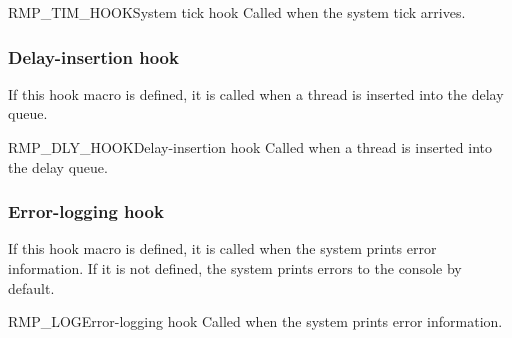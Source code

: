 \begin{apidesc}{RMP\_TIM\_HOOK}{System tick hook}\label{api:RMP_TIM_HOOK}
    Called when the system tick arrives.
    \begin{apiparams}
    \end{apiparams}
    \begin{apiret}
    \end{apiret}
\end{apidesc}

\subsubsection{Delay-insertion hook}

If this hook macro is defined, it is called when a thread is inserted into the delay queue.

\begin{apidesc}{RMP\_DLY\_HOOK}{Delay-insertion hook}\label{api:RMP_DLY_HOOK}
    Called when a thread is inserted into the delay queue.
    \begin{apiparams}
    \end{apiparams}
    \begin{apiret}
    \end{apiret}
\end{apidesc}

\subsubsection{Error-logging hook}

If this hook macro is defined, it is called when the system prints error information.
If it is not defined, the system prints errors to the console by default.

\begin{apidesc}{RMP\_LOG}{Error-logging hook}\label{api:RMP_Log}
    Called when the system prints error information.
    \begin{apiparams}
    \end{apiparams}
    \begin{apiret}
    \end{apiret}
\end{apidesc}

